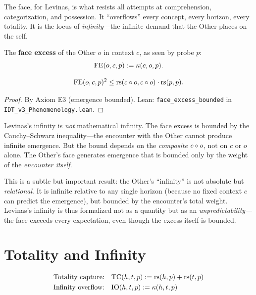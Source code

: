 The face, for Levinas, is what resists all attempts at comprehension,
categorization, and possession. It ``overflows'' every concept, every horizon,
every totality. It is the locus of \emph{infinity}---the infinite demand that
the Other places on the self.

\begin{definition}
\label{def:face-excess}
The \textbf{face excess} of the Other $o$ in context $c$, as seen by probe $p$:
\[
\mathrm{FE}(o, c, p) := \kappa(c, o, p).
\]
\end{definition}

\begin{theorem}
\label{thm:face-bounded}
\[
\mathrm{FE}(o, c, p)^2 \leq \mathrm{rs}(c \circ o, c \circ o) \cdot \mathrm{rs}(p, p).
\]
\end{theorem}

\begin{proof}
By Axiom E3 (emergence bounded).
Lean: \texttt{face\_excess\_bounded} in \texttt{IDT\_v3\_Phenomenology.lean}.
\end{proof}

\begin{interpretation}
\label{interp:face-bounded}
Levinas's infinity is \emph{not} mathematical infinity. The face excess is
bounded by the Cauchy--Schwarz inequality---the encounter with the Other cannot
produce infinite emergence. But the bound depends on the \emph{composite}
$c \circ o$, not on $c$ or $o$ alone. The Other's face generates emergence
that is bounded only by the weight of the \emph{encounter itself}.

This is a subtle but important result: the Other's ``infinity'' is not
absolute but \emph{relational}. It is infinite relative to any single horizon
(because no fixed context $c$ can predict the emergence), but bounded by the
encounter's total weight. Levinas's infinity is thus formalized not as a
quantity but as an \emph{unpredictability}---the face exceeds every
expectation, even though the excess itself is bounded.
\end{interpretation}

\section{Totality and Infinity}

\begin{definition}
\label{def:totality-infinity}
\begin{align}
\text{Totality capture:} &\quad \mathrm{TC}(h, t, p) := \mathrm{rs}(h, p) + \mathrm{rs}(t, p) \\
\text{Infinity overflow:} &\quad \mathrm{IO}(h, t, p) := \kappa(h, t, p)
\end{align}
\end{definition}

